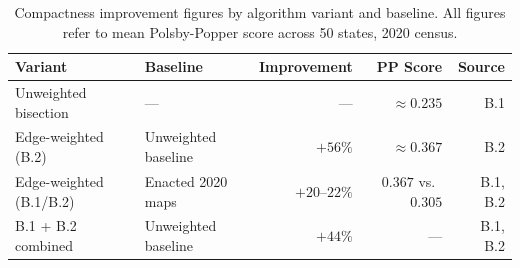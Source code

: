 \begin{table}[h]
\centering
\caption{Compactness improvement figures by algorithm variant and baseline. All figures refer to mean Polsby-Popper score across 50 states, 2020 census.}
\label{tab:compactness-headline}
\begin{tabular}{llrrr}
\toprule
Variant & Baseline & Improvement & PP Score & Source \\
\midrule
Unweighted bisection & — & — & $\approx 0.235$ & B.1 \\
Edge-weighted (B.2) & Unweighted baseline & $+56\%$ & $\approx 0.367$ & B.2 \\
Edge-weighted (B.1/B.2) & Enacted 2020 maps & $+20$--$22\%$ & $0.367$ vs.\ $0.305$ & B.1, B.2 \\
B.1 + B.2 combined & Unweighted baseline & $+44\%$ & — & B.1, B.2 \\
\bottomrule
\end{tabular}
\end{table}
